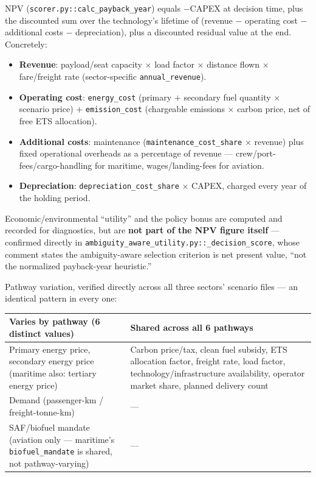 \documentclass{article}
\begin{document}
NPV (\texttt{scorer.py::calc\_payback\_year}) equals $-$CAPEX at decision
time, plus the discounted sum over the technology's lifetime of (revenue
$-$ operating cost $-$ additional costs $-$ depreciation), plus a discounted
residual value at the end. Concretely:
\begin{itemize}
  \item \textbf{Revenue}: payload/seat capacity $\times$ load factor
    $\times$ distance flown $\times$ fare/freight rate (sector-specific
    \verb|annual_revenue|).
  \item \textbf{Operating cost}: \verb|energy_cost| (primary $+$ secondary
    fuel quantity $\times$ scenario price) $+$ \verb|emission_cost|
    (chargeable emissions $\times$ carbon price, net of free ETS
    allocation).
  \item \textbf{Additional costs}: maintenance
    (\verb|maintenance_cost_share| $\times$ revenue) plus fixed operational
    overheads as a percentage of revenue --- crew/port-fees/cargo-handling
    for maritime, wages/landing-fees for aviation.
  \item \textbf{Depreciation}: \verb|depreciation_cost_share| $\times$
    CAPEX, charged every year of the holding period.
\end{itemize}

Economic/environmental ``utility'' and the policy bonus are computed and
recorded for diagnostics, but are \textbf{not part of the NPV figure
itself} --- confirmed directly in
\texttt{ambiguity\_aware\_utility.py::\_decision\_score}, whose comment
states the ambiguity-aware selection criterion is net present value, ``not
the normalized payback-year heuristic.''

Pathway variation, verified directly across all three sectors' scenario
files --- an identical pattern in every one:

\begin{longtable}{p{7.5cm}p{7.5cm}}
\textbf{Varies by pathway (6 distinct values)} & \textbf{Shared across all 6 pathways} \\
\hline
\endhead
Primary energy price, secondary energy price (maritime also: tertiary energy price) &
  Carbon price/tax, clean fuel subsidy, ETS allocation factor, freight rate, load factor, technology/infrastructure availability, operator market share, planned delivery count \\
Demand (passenger-km / freight-tonne-km) & --- \\
SAF/biofuel mandate (aviation only --- maritime's \texttt{biofuel\_mandate} is shared, not pathway-varying) & --- \\
\end{longtable}
\end{document}
